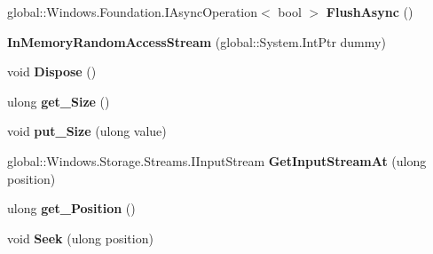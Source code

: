 \begin{DoxyCompactItemize}
global\+::\+Windows.\+Foundation.\+I\+Async\+Operation$<$ bool $>$ {\bfseries Flush\+Async} ()
\item 
\mbox{\label{class_windows_1_1_storage_1_1_streams_1_1_in_memory_random_access_stream_a58fe83e628070875813e711cb730b9e1}} 
{\bfseries In\+Memory\+Random\+Access\+Stream} (global\+::\+System.\+Int\+Ptr dummy)
\item 
\mbox{\label{class_windows_1_1_storage_1_1_streams_1_1_in_memory_random_access_stream_a46eac03da7bc9cadfb0e54b02113e49d}} 
void {\bfseries Dispose} ()
\item 
\mbox{\label{class_windows_1_1_storage_1_1_streams_1_1_in_memory_random_access_stream_aa647257f534704ae03fa50c86a98f839}} 
ulong {\bfseries get\+\_\+\+Size} ()
\item 
\mbox{\label{class_windows_1_1_storage_1_1_streams_1_1_in_memory_random_access_stream_ac8b380272b33f6167715e900ce8b155f}} 
void {\bfseries put\+\_\+\+Size} (ulong value)
\item 
\mbox{\label{class_windows_1_1_storage_1_1_streams_1_1_in_memory_random_access_stream_a4eb2c7faf4803409163b311c912a083b}} 
global\+::\+Windows.\+Storage.\+Streams.\+I\+Input\+Stream {\bfseries Get\+Input\+Stream\+At} (ulong position)
\item 
\mbox{\label{class_windows_1_1_storage_1_1_streams_1_1_in_memory_random_access_stream_a60db0cabd4922fd35bbb2d64a7b381f1}} 
ulong {\bfseries get\+\_\+\+Position} ()
\item 
\mbox{\label{class_windows_1_1_storage_1_1_streams_1_1_in_memory_random_access_stream_a9dca3616e54f1113bfe6b6705612182b}} 
void {\bfseries Seek} (ulong position)
\item 
\mbox{\label{class_windows_1_1_storage_1_1_streams_1_1_in_memory_random_access_stream_aa39fd9f2f1b3be1d9282cff918d74651}} 

\end{DoxyCompactItemize}
